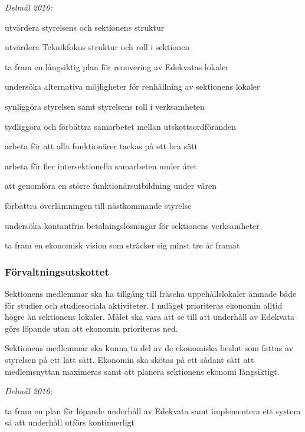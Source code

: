 \documentclass[../_main/handlingar.tex]{subfiles}
\begin{document}
\emph{Delmål 2016:}
\begin{dashlist}
    \item utvärdera styrelsens och sektionens struktur
    \item utvärdera Teknikfokus struktur och roll i sektionen
    \item ta fram en långsiktig plan för renovering av Edekvatas lokaler
    \item undersöka alternativa möjligheter för renhållning av sektionens lokaler
    \item synliggöra styrelsen samt styrelsens roll i verksamheten
    \item tydliggöra och förbättra samarbetet mellan utskottsordföranden
    \item arbeta för att alla funktionärer tackas på ett bra sätt
    \item arbeta för fler intersektionella samarbeten under året
    \item att genomföra en större funktionärsutbildning under våren
    \item förbättra överlämningen till nästkommande styrelse
    \item undersöka kontantfria betalningslösningar för sektionens verksamheter
    \item ta fram en ekonomisk vision som sträcker sig minst tre år framåt
\end{dashlist}

\subsubsection*{Förvaltningsutskottet}
Sektionens medlemmar ska ha tillgång till fräscha uppehållslokaler ämnade både för studier och studiesociala aktiviteter. I nuläget prioriteras ekonomin alltid högre än sektionens lokaler. Målet ska vara att se till att underhåll av Edekvata görs löpande utan att ekonomin prioriteras ned.

Sektionens medlemmar ska kunna ta del av de ekonomiska beslut som fattas av styrelsen på ett lätt sätt. Ekonomin ska skötas på ett sådant sätt att medlemsnyttan maximeras samt att planera sektionens ekonomi långsiktigt.

\emph{Delmål 2016:}
\begin{dashlist}
    \item ta fram en plan för löpande underhåll av Edekvata samt implementera ett system så att underhåll utförs kontinuerligt
\end{dashlist}
\end{document}
